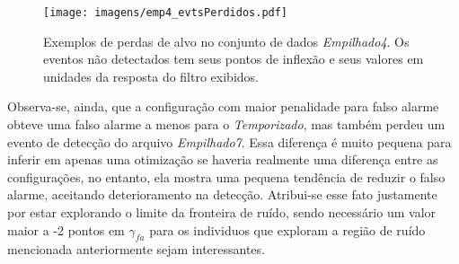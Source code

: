 \begin{sidewaysfigure}[p]
\centering
\texttt{[image: imagens/emp4\_evtsPerdidos.pdf]}
\caption[Exemplos de perdas de alvo no conjunto de dados Empilhado4]
{Exemplos de perdas de alvo no conjunto de dados \emph{Empilhado4}. Os
eventos não detectados tem seus pontos de inflexão e seus valores em
unidades da resposta do filtro exibidos.}
\label{fig:lampadas_emp4}
\end{sidewaysfigure}

Observa-se, ainda, que a configuração com maior penalidade para falso
alarme obteve uma falso alarme a menos para o \emph{Temporizado}, mas
também perdeu um evento de detecção do arquivo \emph{Empilhado7}.
Essa diferença é muito pequena para inferir em apenas uma otimização
se haveria realmente uma diferença entre as configurações, no entanto,
ela mostra uma pequena tendência de reduzir o falso alarme, aceitando
deterioramento na detecção. Atribui-se esse fato
justamente por estar explorando o limite da fronteira de ruído, sendo
necessário um valor maior a -2 pontos em $\gamma_{fa}$ para os
individuos que exploram a região de ruído mencionada anteriormente
sejam interessantes. 


